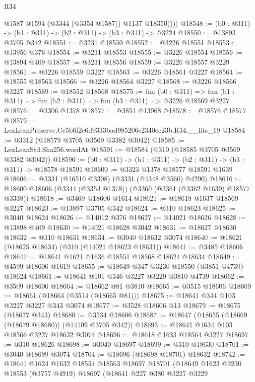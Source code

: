 \begin{lexlean}{R34}
\begin{coremodule}
            @1587
            @1594
            (@3344 (@3354 @1587))
            @1137
            @18350))))
@18548 := (b0 : @311) -> (b1 : @311) -> (b2 : @311) -> (b3 : @311) -> @3224
@18550 := @13893 @3705 @342
@18551 := @3231 @18550
@18552 := @3226 @18551
@18553 := @13956 @376
@18554 := @3231 @18553
@18555 := @3226 @18554
@18556 := @13894 @409
@18557 := @3231 @18556
@18559 := @3226 @18557 @3229
@18561 := @3226 @18559 @3227
@18563 := @3226 @18561 @3227
@18564 := @18555 @18563
@18566 := @3226 @18564 @3227
@18568 := @3226 @18566 @3227
@18569 := @18552 @18568
@18575 := fun (b0 : @311) =>
  fun (b1 : @311) => fun (b2 : @311) => fun (b3 : @311) => @3226 @18569 @3227
@18576 := @3306 @1378
@18577 := @3851 @13968
@18578 := @18576 @18577
@18579 := LexLeanPreserve.Cc5b6f2e6d9333bad985206c2340ec23b.R34.__fits_19
@18584 := @3312 (@18579 @3705 @3569 @3382 @3042)
@18585 := LexLeanStd.Sha256.wordAt
@18591 := @18584 (@310 (@18585 @3705 @3569 @3382 @3042))
@18596 := (b0 : @311) -> (b1 : @311) -> (b2 : @311) -> (b3 : @311) -> @18578 @18591
@18600 := @3323 @1378 @18577 @18591 @1639
@18606 := @3331 (@16510 @3308) (@3331 (@4348 @3560) @4290)
@18616 := @18600 @18606 (@3344 (@3354 @1378)) (@3360 (@3361 (@3362 @1639) @18577 @3338))
@18618 := @3469 @18606 @1614
@18621 := @18618 @1637 @18569 @3227
@18623 := @13897 @3705 @342
@18624 := @310 @18623
@18625 := @3040 @18624
@18626 := @14012 @376
@18627 := @14021 @18626
@18628 := @13898 @409
@18630 := @14021 @18628 @3042
@18631 := @18627 @18630
@18632 := @310 @18631
@18634 := @3040 @18632 @3074
@18640 := @18621 (@18625 @18634) (@310 (@14021 @18623 @18631))
@18641 := @3485 @18606
@18647 := @18641 @1621 @1636 @18551 @18568 @18624 @18634
@18649 := @4599 @18606 @1619
@18655 := @18649 @347 @3230 @18550 (@3851 @4739) @18624
@18661 := @18641 @101 @346 @3227 @3229 @3810 @4739
@18662 := @3509 @18606
@18664 := @18662 @81 @3810
@18665 := @3515 @18606
@18669 := @18661 (@18664 (@3514 (@18665 @81)))
@18675 := @18641 @344 @103 @3227 @3227 @343 @3074
@18677 := @3528 @18606 @13
@18679 := @18675 (@18677 @343)
@18680 := @3534 @18606
@18687 := @18647 (@18655 (@18669 (@18679 @18680)) (@14109 @3705 @342))
@18693 := @18641 @1634 @103 @18566 @3227 @18632 @3074
@18696 := @18618 @1633 @18564 @3227
@18697 := @310 @18626
@18698 := @3040 @18697
@18699 := @310 @18630
@18701 := @3040 @18699 @3074
@18704 := @18696 (@18698 @18701) @18632
@18742 := @18641
    @1624
    @1632
    @18554
    @18563
    @18697
    @18701
    (@18649
      @1623
      @3230
      @18553
      (@3757 @4919)
      @18697
      (@18641
        @227
        @380
        @3227
        @3229

\end{coremodule}
\end{lexlean}
